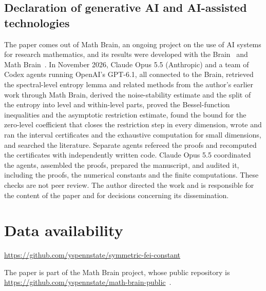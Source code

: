 \documentclass[11pt]{amsart}
\theoremstyle{definition}
\theoremstyle{remark}
\begin{document}
\begin{samepage}
\section*{Declaration of generative AI and AI-assisted technologies}
The paper comes out of Math Brain, an ongoing project on the use of AI systems for research mathematics, and its results were developed with the Brain~\cite{BrainFramework} and Math Brain~\cite{MathBrainRepo}. In November 2026, Claude Opus 5.5 (Anthropic) and a team of Codex agents running OpenAI's GPT-6.1, all connected to the Brain, retrieved the spectral-level entropy lemma and related methods from the author's earlier work through Math Brain, derived the noise-stability estimate and the split of the entropy into level and within-level parts, proved the Bessel-function inequalities and the asymptotic restriction estimate, found the bound for the zero-level coefficient that closes the restriction step in every dimension, wrote and ran the interval certificates and the exhaustive computation for small dimensions, and searched the literature. Separate agents refereed the proofs and recomputed the certificates with independently written code. Claude Opus 5.5 coordinated the agents, assembled the proofs, prepared the manuscript, and audited it, including the proofs, the numerical constants and the finite computations. These checks are not peer review. The author directed the work and is responsible for the content of the paper and for decisions concerning its dissemination.
\par
\end{samepage}

\section*{Data availability}
\url{https://github.com/yspennstate/symmetric-fei-constant}

The paper is part of the Math Brain project, whose public repository is \url{https://github.com/yspennstate/math-brain-public}~\cite{MathBrainRepo}.
\end{document}
